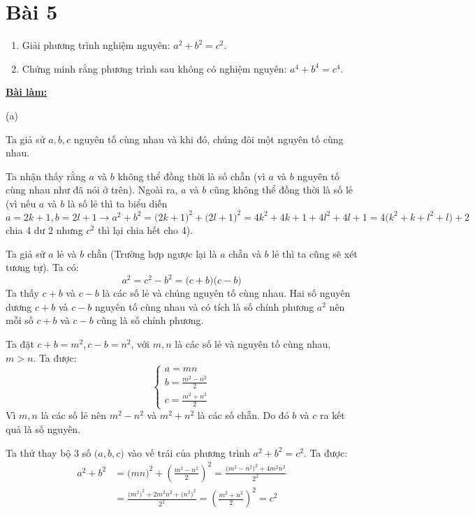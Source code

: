 \section*{Bài 5}

\begin{enumerate}[label=(\alph*)]
\item Giải phương trình nghiệm nguyên: $a^2 + b^2 = c^2$.
\item Chứng minh rằng phương trình sau không có nghiệm nguyên: $a^4 + b^4 = c^4$.
\end{enumerate}
	

\centering
\textbf{\underline{Bài làm:}}

\justifying
(a)

Ta giả sử $a, b, c$ nguyên tố cùng nhau và khi đó, chúng đôi một nguyên tố cùng nhau.

Ta nhận thấy rằng $a$ và $b$ không thể đồng thời là số chẵn (vì $a$ và $b$ nguyên tố cùng nhau như đã nói ở trên). Ngoài ra, $a$ và $b$ cũng không thể đồng thời là số lẻ (vì nếu $a$ và $b$ là số lẻ thì ta biểu diễn $a = 2k + 1, b = 2l + 1 \rightarrow a^2 + b^2 = \big( 2k + 1 \big)^2 + \big( 2l + 1 \big)^2 = 4k^2 + 4k + 1 + 4l^2 + 4l + 1 = 4 \big( k^2 + k + l^2 + l \big) + 2$ chia 4 dư 2 nhưng $c^2$ thì lại chia hết cho 4).

Ta giả sử $a$ lẻ và $b$ chẵn (Trường hợp ngược lại là $a$ chẵn và $b$ lẻ thì ta cũng sẽ xét tương tự). Ta có: $$a^2 = c^2 - b^2 = \big( c + b \big) \big( c - b \big)$$
Ta thấy $c + b$ và $c - b$ là các số lẻ và chúng nguyên tố cùng nhau. Hai số nguyên dương $c + b$ và $c - b$ nguyên tố cùng nhau và có tích là số chính phương $a^2$ nên mỗi số $c + b$ và $c - b$ cũng là số chính phương.

Ta đặt $c + b = m^2, c - b = n^2$, với $m, n$ là các số lẻ và nguyên tố cùng nhau, $m > n$. Ta được:
$$ \begin{cases}
        a = mn\\
        b = \displaystyle \frac{m^2 - n^2}{2}\\
        c = \displaystyle \frac{m^2 + n^2}{2}
\end{cases} $$
Vì $m, n$ là các số lẻ nên $m^2 - n^2$ và $m^2 + n^2$ là các số chẵn. Do đó $b$ và $c$ ra kết quả là số nguyên.

Ta thử thay bộ 3 số $\big( a, b, c \big)$ vào vế trái của phương trình $a^2 + b^2 = c^2$. Ta được:
\begin{align*}
    a^2 + b^2 &= \big( mn \big)^2 + \left( \frac{m^2 - n^2}{2} \right)^2 = \frac{ \big( m^2 - n^2 \big)^2 + 4m^{2}n^{2}}{2^2}\\
              &= \frac{ \big( m^2 \big)^2 + 2m^{2}n^{2} + \big( n^2 \big)^2}{2^2} = \left( \frac{m^2 + n^2}{2} \right)^2 = c^2
\end{align*}

